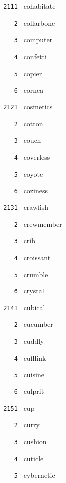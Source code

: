 \documentclass[11pt]{article}
\begin{document}
\begin{multicols}{6}
\small
\noindent \texttt{ 2111 } cohabitate  \par
\noindent \texttt{ \ \ \ 2 } collarbone  \par
\noindent \texttt{ \ \ \ 3 } computer  \par
\noindent \texttt{ \ \ \ 4 } confetti  \par
\noindent \texttt{ \ \ \ 5 } copier  \par
\noindent \texttt{ \ \ \ 6 } cornea  \par
\vspace{3mm}
\noindent \texttt{ 2121 } cosmetics  \par
\noindent \texttt{ \ \ \ 2 } cotton  \par
\noindent \texttt{ \ \ \ 3 } couch  \par
\noindent \texttt{ \ \ \ 4 } coverless  \par
\noindent \texttt{ \ \ \ 5 } coyote  \par
\noindent \texttt{ \ \ \ 6 } coziness  \par
\vspace{3mm}
\noindent \texttt{ 2131 } crawfish  \par
\noindent \texttt{ \ \ \ 2 } crewmember  \par
\noindent \texttt{ \ \ \ 3 } crib  \par
\noindent \texttt{ \ \ \ 4 } croissant  \par
\noindent \texttt{ \ \ \ 5 } crumble  \par
\noindent \texttt{ \ \ \ 6 } crystal  \par
\vspace{3mm}
\noindent \texttt{ 2141 } cubical  \par
\noindent \texttt{ \ \ \ 2 } cucumber  \par
\noindent \texttt{ \ \ \ 3 } cuddly  \par
\noindent \texttt{ \ \ \ 4 } cufflink  \par
\noindent \texttt{ \ \ \ 5 } cuisine  \par
\noindent \texttt{ \ \ \ 6 } culprit  \par
\vspace{3mm}
\noindent \texttt{ 2151 } cup  \par
\noindent \texttt{ \ \ \ 2 } curry  \par
\noindent \texttt{ \ \ \ 3 } cushion  \par
\noindent \texttt{ \ \ \ 4 } cuticle  \par
\noindent \texttt{ \ \ \ 5 } cybernetic  \par

\end{multicols}
\end{document}
